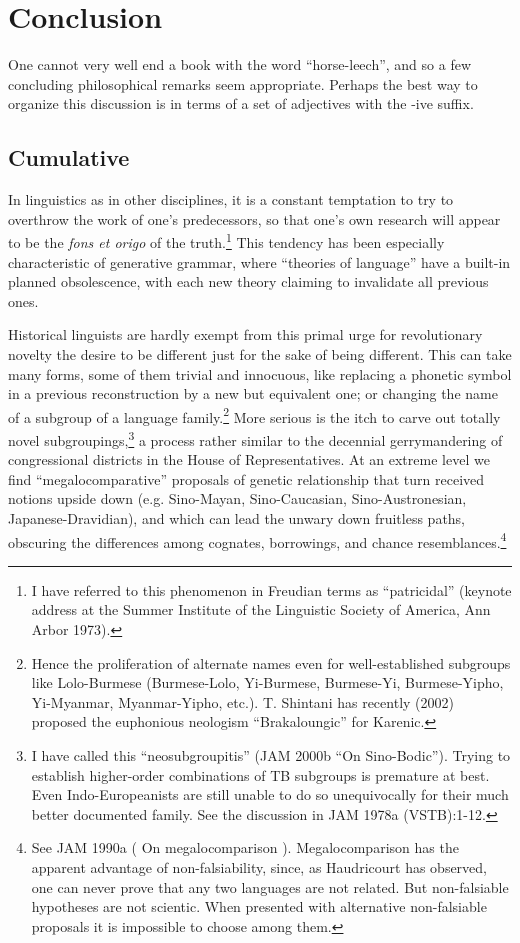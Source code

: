\documentclass[10pt]{article}
\begin{document}
\section{Conclusion}
One cannot very well end a book with the word ``horse-leech'', and so a few concluding philosophical remarks seem appropriate. Perhaps the best way to organize this discussion is in terms of a set of adjectives with the -ive suffix.
\subsection{Cumulative}
In linguistics as in other disciplines, it is a constant temptation to try to overthrow the work of one's predecessors, so that one's own research will appear to be the {\it fons et origo} of the truth.\footnote{I have referred to this phenomenon in Freudian terms as ``patricidal'' (keynote address at the Summer Institute of the Linguistic Society of America, Ann Arbor 1973).}
This tendency has been especially characteristic of generative grammar, where ``theories of language'' have a built-in planned obsolescence, with each new theory claiming to invalidate all previous ones.

Historical linguists are hardly exempt from this primal urge for revolutionary novelty  the desire to be different just for the sake of being different. This can take many forms, some of them trivial and innocuous, like replacing a phonetic symbol in a previous reconstruction by a new but equivalent one; or changing the name of a subgroup of a language family.\footnote{Hence the proliferation of alternate names even for well-established subgroups like Lolo-Burmese (Burmese-Lolo, Yi-Burmese, Burmese-Yi, Burmese-Yipho, Yi-Myanmar, Myanmar-Yipho, etc.). T. Shintani has recently (2002) proposed the euphonious neologism ``Brakaloungic'' for Karenic.}
More serious is the itch to carve out totally novel subgroupings,\footnote{I have called this ``neosubgroupitis'' (JAM 2000b ``On Sino-Bodic''). Trying to establish higher-order combinations of TB subgroups is premature at best. Even Indo-Europeanists are still unable to do so unequivocally for their much better documented family. See the discussion in JAM 1978a (VSTB):1-12.} a process rather similar to the decennial gerrymandering of congressional districts in the House of Representatives. At an extreme level we find ``megalocomparative'' proposals of genetic relationship that turn received notions upside down (e.g. Sino-Mayan, Sino-Caucasian, Sino-Austronesian, Japanese-Dravidian), and which can lead the unwary down fruitless paths, obscuring the differences among cognates, borrowings, and chance resemblances.\footnote{See JAM 1990a ( On megalocomparison ). Megalocomparison has the apparent advantage of non-falsi\xde ability, since, as Haudricourt has observed, one can never prove that any two languages are not related. But non-falsi\xde able hypotheses are not scienti\xde c. When presented with alternative non-falsi\xde able proposals it is impossible to choose among them.}
\end{document}
